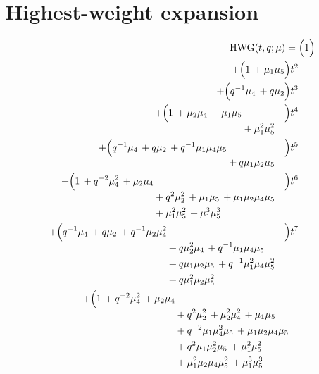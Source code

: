 \documentclass[10pt]{article}
\begin{document}
\section{Highest-weight expansion}
\[
\begin{aligned}
\mathrm{HWG}(t,q;\mu) ={}&
   \Bigl(1\Bigr) \\
  + \Bigl(1\,+\mu_{1}\mu_{5}\Bigr)t^{2} \\
  + \Bigl(q^{-1}\mu_{4}\,+q\mu_{2}\Bigr)t^{3} \\
  + \Bigl(\begin{aligned}[t]1\,+\mu_{2}\mu_{4}\,+\mu_{1}\mu_{5} \\
  &{}+\mu_{1}^{2}\mu_{5}^{2}\end{aligned}\Bigr)t^{4} \\
  + \Bigl(\begin{aligned}[t]q^{-1}\mu_{4}\,+q\mu_{2}\,+q^{-1}\mu_{1}\mu_{4}\mu_{5} \\
  &{}+q\mu_{1}\mu_{2}\mu_{5}\end{aligned}\Bigr)t^{5} \\
  + \Bigl(\begin{aligned}[t]1\,+q^{-2}\mu_{4}^{2}\,+\mu_{2}\mu_{4} \\
  &{}+q^{2}\mu_{2}^{2}\,+\mu_{1}\mu_{5}\,+\mu_{1}\mu_{2}\mu_{4}\mu_{5} \\
  &{}+\mu_{1}^{2}\mu_{5}^{2}\,+\mu_{1}^{3}\mu_{5}^{3}\end{aligned}\Bigr)t^{6} \\
  + \Bigl(\begin{aligned}[t]q^{-1}\mu_{4}\,+q\mu_{2}\,+q^{-1}\mu_{2}\mu_{4}^{2} \\
  &{}+q\mu_{2}^{2}\mu_{4}\,+q^{-1}\mu_{1}\mu_{4}\mu_{5} \\
  &{}+q\mu_{1}\mu_{2}\mu_{5}\,+q^{-1}\mu_{1}^{2}\mu_{4}\mu_{5}^{2} \\
  &{}+q\mu_{1}^{2}\mu_{2}\mu_{5}^{2}\end{aligned}\Bigr)t^{7} \\
  + \Bigl(\begin{aligned}[t]1\,+q^{-2}\mu_{4}^{2}\,+\mu_{2}\mu_{4} \\
  &{}+q^{2}\mu_{2}^{2}\,+\mu_{2}^{2}\mu_{4}^{2}\,+\mu_{1}\mu_{5} \\
  &{}+q^{-2}\mu_{1}\mu_{4}^{2}\mu_{5}\,+\mu_{1}\mu_{2}\mu_{4}\mu_{5} \\
  &{}+q^{2}\mu_{1}\mu_{2}^{2}\mu_{5}\,+\mu_{1}^{2}\mu_{5}^{2} \\
  &{}+\mu_{1}^{2}\mu_{2}\mu_{4}\mu_{5}^{2}\,+\mu_{1}^{3}\mu_{5}^{3} \\

\end{aligned}
\end{aligned}\]
\end{document}
